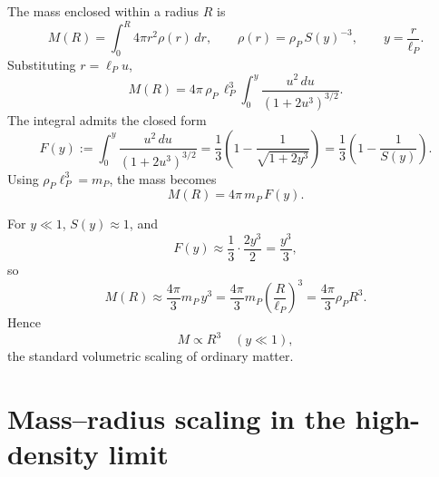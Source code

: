 \documentclass[a4paper,1pt,oneside,openany]{book}
\begin{document}
The mass enclosed within a radius $R$ is
\begin{equation}
M(R)=\int_{0}^{R}4\pi r^{2}\rho(r)\,dr,
\qquad
\rho(r)=\rho_{P}\,S(y)^{-3},
\qquad
y=\frac{r}{\ell_{P}}.
\label{eq:M-integral}
\end{equation}
Substituting $r=\ell_{P}u$,
\begin{equation}
M(R)
=
4\pi\,\rho_{P}\,\ell_{P}^{3}
\int_{0}^{y}\frac{u^{2}\,du}{(1+2u^{3})^{3/2}}.
\label{eq:M-dimless}
\end{equation}
The integral admits the closed form
\begin{equation}
F(y)
:=
\int_{0}^{y}\frac{u^{2}\,du}{(1+2u^{3})^{3/2}}
=
\frac{1}{3}\left(1-\frac{1}{\sqrt{1+2y^{3}}}\right)
=
\frac{1}{3}\left(1-\frac{1}{S(y)}\right).
\label{eq:F-closed}
\end{equation}
Using $\rho_{P}\ell_{P}^{3}=m_{P}$, the mass becomes
\begin{equation}
\boxed{\;M(R)=4\pi\,m_{P}\,F(y).\;}
\label{eq:M-simple}
\end{equation}

For $y\ll 1$, $S(y)\approx 1$, and
\begin{equation}
F(y)\approx \frac{1}{3}\cdot\frac{2y^{3}}{2}=\frac{y^{3}}{3},
\label{eq:F-low}
\end{equation}
so
\begin{equation}
M(R)\approx \frac{4\pi}{3}m_{P}\,y^{3}
=
\frac{4\pi}{3}m_{P}\left(\frac{R}{\ell_{P}}\right)^{3}
=
\frac{4\pi}{3}\rho_{P}R^{3}.
\label{eq:M-low}
\end{equation}
Hence
\begin{equation}
\boxed{\;M\propto R^{3}\quad (y\ll 1),\;}
\label{eq:scaling-cubic}
\end{equation}
the standard volumetric scaling of ordinary matter.

\section{Mass--radius scaling in the high-density limit}
\end{document}

